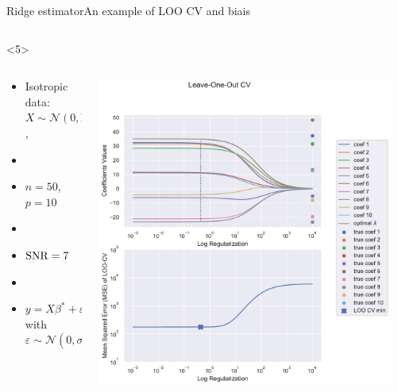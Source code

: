 \documentclass[10pt,aspectratio=43]{beamer}
\begin{document}
\begin{frame}{Ridge estimator}{An example of LOO CV and biais}
\begin{onlyenv}
\begin{columns}
\begin{column}{0.7\textwidth}
\begin{center}
                 \end{center}
            \end{column}
            \end{columns}
    \end{onlyenv}
    \begin{onlyenv}<5>
        \begin{columns}
            \begin{column}{0.4\textwidth}
                \begin{itemize}
                    \item Isotropic data: $X\sim\mathcal{N}(0,\mathrm{Id})$,
                    \item[]
                    \item $n=50$, $p=10$
                    \item[]
                    \item \textcolor{red}{$\operatorname{SNR}=7$}
                    \item[]
                    \item $y = X\beta^*+\varepsilon$ with $\varepsilon\sim \mathcal{N}(0, \sigma^2\mathrm{Id})$
                \end{itemize}
            \end{column}
            \begin{column}{0.7\textwidth}
                \begin{center}
                        \includegraphics[width=0.95\textwidth]{path_ridge_complete_7_.pdf}

\end{center}
\end{column}
\end{columns}
\end{onlyenv}
\end{frame}
\end{document}
